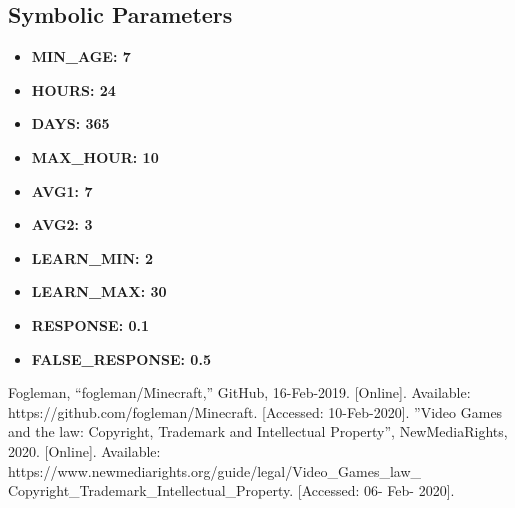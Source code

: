 \documentclass[12pt, titlepage]{article}
\begin{document}
\subsection{Symbolic Parameters}


\begin{itemize}
    \item \textbf{MIN\_AGE: 7}
    \item \textbf{HOURS: 24}
    \item \textbf{DAYS: 365}
    \item \textbf{MAX\_HOUR: 10}
    \item \textbf{AVG1: 7}
    \item \textbf{AVG2: 3}
    \item \textbf{LEARN\_MIN: 2}
    \item \textbf{LEARN\_MAX: 30}
    \item \textbf{RESPONSE: 0.1}
    \item \textbf{FALSE\_RESPONSE: 0.5}
\end{itemize}

\newpage
\begin{thebibliography}{9}
Fogleman, “fogleman/Minecraft,” 
        GitHub, 16-Feb-2019. [Online]. Available: 
        https://github.com/fogleman/Minecraft. [Accessed: 
        10-Feb-2020].
”Video Games and the law: Copyright, 
        Trademark and Intellectual Property”, NewMediaRights, 2020. [Online]. 
        Available: https://www.newmediarights.org/guide/legal/Video\_Games\_law\_
        Copyright\_Trademark\_Intellectual\_Property. [Accessed: 06- Feb- 
        2020].
\end{thebibliography}
\end{document}
